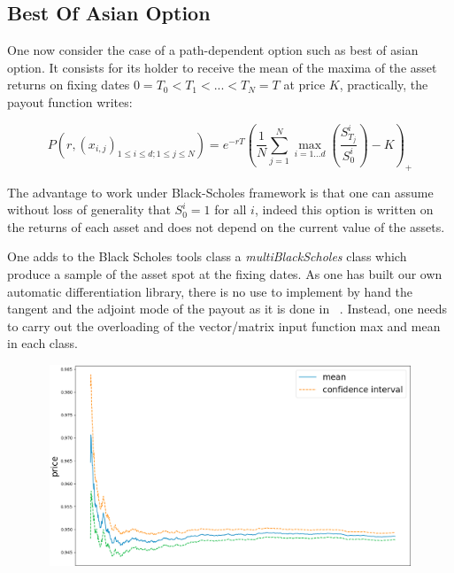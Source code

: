 \documentclass {article}
\begin{document}
		\subsection{Best Of Asian Option}

			One now consider the case of a path-dependent option such as best of asian option.
			It consists for its holder to receive the mean of the maxima of the asset returns on fixing dates
			$0 = T_{0} < T_{1} < ... < T_{N} = T$ at price $K$, practically, the payout function writes:

			$$P(r, (x_{i,j})_{1 \leq i \leq d ; 1 \leq j \leq N}) = e^{-rT} \left( \frac{1}{N} \displaystyle{\sum_{j = 1}^{N}{\max_{i = 1 ... d}{\left(\frac{S^{i}_{T_{j}}}{S^{i}_{0}}\right)}}} - K\right)_{+}$$
		
			The advantage to work under Black-Scholes framework is that one can assume without loss of generality that $S_{0}^{i} = 1$ for all $i$,
			indeed this option is written on the returns of each asset and does not depend on the current value of the assets.

			One adds to the Black Scholes tools class a \textit{multiBlackScholes} class which produce a sample of the asset spot at the fixing dates.
			As one has built our own automatic differentiation library, there is no use to implement by hand the tangent and the adjoint mode of the payout as it is done in ~\cite{21}.
			Instead, one needs to carry out the overloading of the vector/matrix input function max and mean in each class.

			\newpage
			
			\begin{center}
				\begin{figure}[!h]
					\centering
				        \includegraphics[width=15cm, height=6cm]{bestOfAsianOptionFiniteDifferenceMethodPrice.png}
				\end{figure}
			\end{center}
			
\end{document}
